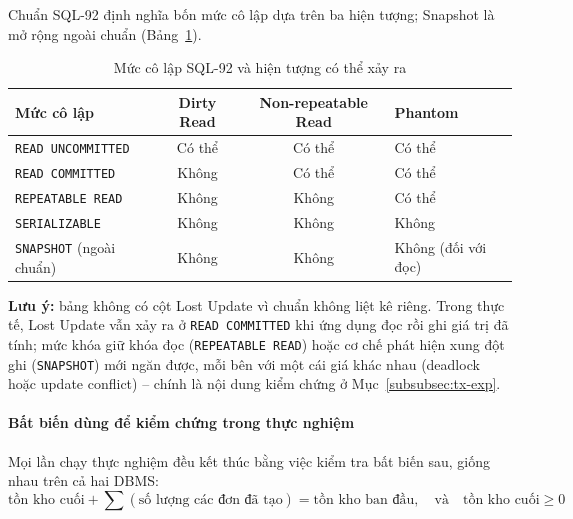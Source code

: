 Chuẩn SQL-92 định nghĩa bốn mức cô lập dựa trên ba hiện tượng; Snapshot là mở rộng ngoài chuẩn (Bảng~\ref{tab:tx-isolation}).

\begin{table}[htbp]
\centering
\caption{Mức cô lập SQL-92 và hiện tượng có thể xảy ra}
\label{tab:tx-isolation}
\renewcommand{\arraystretch}{1.2}
\begin{tabularx}{\textwidth}{l c c X}
\toprule
\textbf{Mức cô lập} & \textbf{Dirty Read} & \textbf{Non-repeatable Read} & \textbf{Phantom} \\
\midrule
\texttt{READ UNCOMMITTED} & Có thể & Có thể & Có thể \\
\texttt{READ COMMITTED} & Không & Có thể & Có thể \\
\texttt{REPEATABLE READ} & Không & Không & Có thể \\
\texttt{SERIALIZABLE} & Không & Không & Không \\
\texttt{SNAPSHOT} (ngoài chuẩn) & Không & Không & Không (đối với đọc) \\
\bottomrule
\end{tabularx}
\end{table}

\textbf{Lưu ý:} bảng không có cột Lost Update vì chuẩn không liệt kê riêng. Trong thực tế, Lost Update vẫn xảy ra ở \texttt{READ COMMITTED} khi ứng dụng đọc rồi ghi giá trị đã tính; mức khóa giữ khóa đọc (\texttt{REPEATABLE READ}) hoặc cơ chế phát hiện xung đột ghi (\texttt{SNAPSHOT}) mới ngăn được, mỗi bên với một cái giá khác nhau (deadlock hoặc update conflict) -- chính là nội dung kiểm chứng ở Mục~\ref{subsubsec:tx-exp}.

\paragraph{Bất biến dùng để kiểm chứng trong thực nghiệm}
\label{par:tx-invariant}\mbox{}

Mọi lần chạy thực nghiệm đều kết thúc bằng việc kiểm tra bất biến sau, giống nhau trên cả hai DBMS:
\begin{equation}
\label{eq:tx-invariant}
\text{tồn kho cuối} + \sum(\text{số lượng các đơn đã tạo}) = \text{tồn kho ban đầu}, \quad \text{và} \quad \text{tồn kho cuối} \ge 0
\end{equation}

